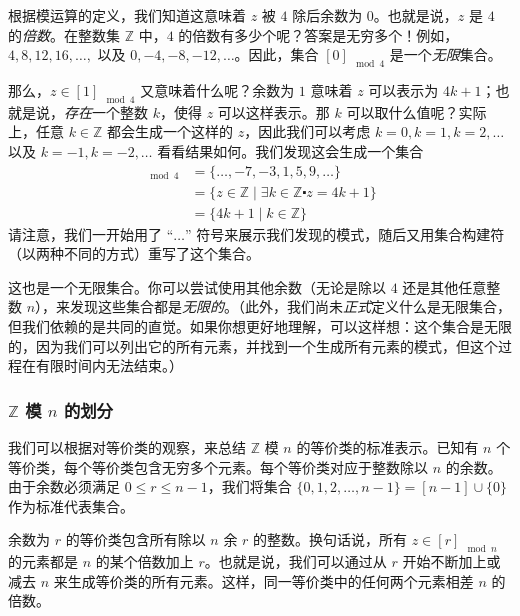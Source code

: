 根据模运算的定义，我们知道这意味着 $z$ 被 $4$ 除后余数为 $0$。也就是说，$z$ 是 $4$ 的\emph{倍数}。在整数集 $\mathbb{Z}$ 中，$4$ 的倍数有多少个呢？答案是无穷多个！例如，$4, 8, 12, 16, \dots ,$ 以及 $0,-4,-8,-12,\dots$。因此，集合 $[0]_{\mod 4}$ 是一个\emph{无限}集合。

那么，$z \in [1]_{\mod 4}$ 又意味着什么呢？余数为 $1$ 意味着 $z$ 可以表示为 $4k + 1$；也就是说，\emph{存在}一个整数 $k$，使得 $z$ 可以这样表示。那 $k$ 可以取什么值呢？实际上，任意 $k \in \mathbb{Z}$ 都会生成一个这样的 $z$，因此我们可以考虑 $k = 0, k = 1, k = 2, \dots$ 以及 $k = -1, k = -2, \dots$ 看看结果如何。我们发现这会生成一个集合
\begin{align*}
    [1]_{\mod 4} &= \{\dots , -7, -3, 1, 5, 9, \dots \} \\
    &= \{z \in \mathbb{Z} \mid \exists k \in \mathbb{Z} \centerdot z = 4k + 1\} \\
    &= \{4k + 1 \mid k \in \mathbb{Z}\}
\end{align*}
请注意，我们一开始用了 ``$\dots$'' 符号来展示我们发现的模式，随后又用集合构建符（以两种不同的方式）重写了这个集合。

这也是一个无限集合。你可以尝试使用其他余数（无论是除以 $4$ 还是其他任意整数 $n$），来发现这些集合都是\emph{无限的}。（此外，我们尚未\emph{正式}定义什么是无限集合，但我们依赖的是共同的直觉。如果你想更好地理解，可以这样想：这个集合是无限的，因为我们可以列出它的所有元素，并找到一个生成所有元素的模式，但这个过程在有限时间内无法结束。）

\subsubsection*{$\mathbb{Z}$ 模 $n$ 的划分}

我们可以根据对等价类的观察，来总结 $\mathbb{Z}$ 模 $n$ 的等价类的标准表示。已知有 $n$ 个等价类，每个等价类包含无穷多个元素。每个等价类对应于整数除以 $n$ 的余数。由于余数必须满足 $0 \le r \le n-1$，我们将集合 $\{0, 1, 2, \dots , n-1\} = [n-1] \cup \{0\}$ 作为标准代表集合。

余数为 $r$ 的等价类包含所有除以 $n$ 余 $r$ 的整数。换句话说，所有 $z \in [r]_{\mod n}$ 的元素都是 $n$ 的某个倍数加上 $r$。也就是说，我们可以通过从 $r$ 开始不断加上或减去 $n$ 来生成等价类的所有元素。这样，同一等价类中的任何两个元素相差 $n$ 的倍数。


